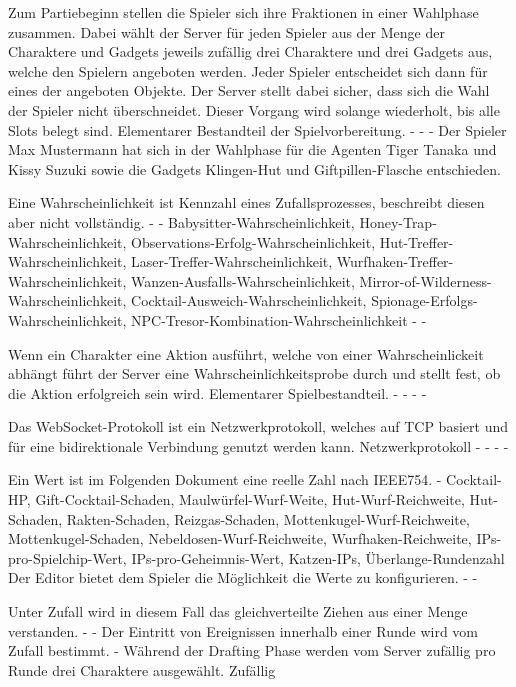 {Zum Partiebeginn stellen die Spieler sich ihre Fraktionen in einer Wahlphase zusammen. Dabei wählt der Server für jeden Spieler aus der Menge der Charaktere und Gadgets jeweils zufällig drei Charaktere und drei Gadgets aus, welche den Spielern angeboten werden. Jeder Spieler entscheidet sich dann für eines der angeboten Objekte. Der Server stellt dabei sicher, dass sich die Wahl der Spieler nicht überschneidet. Dieser Vorgang wird solange wiederholt, bis alle Slots belegt sind.}
{Elementarer Bestandteil der Spielvorbereitung.}
{-}
{-}
{-}
{Der Spieler \glqq{}Max Mustermann \grqq{} hat sich in der Wahlphase für die Agenten \glqq{}Tiger Tanaka\grqq{} und \glqq{}Kissy Suzuki\grqq{} sowie die Gadgets \glqq{}Klingen-Hut\grqq{} und \glqq{}Giftpillen-Flasche\grqq{} entschieden.}

{Eine Wahrscheinlichkeit ist Kennzahl eines Zufallsprozesses, beschreibt diesen aber nicht vollständig.}
{-}
{-}
{Babysitter-Wahrscheinlichkeit, Honey-Trap-Wahrscheinlichkeit, Observations-Erfolg-Wahrscheinlichkeit, Hut-Treffer-Wahrscheinlichkeit, Laser-Treffer-Wahrscheinlichkeit, Wurfhaken-Treffer-Wahrscheinlichkeit, Wanzen-Ausfalls-Wahrscheinlichkeit, Mirror-of-Wilderness-Wahrscheinlichkeit, Cocktail-Ausweich-Wahrscheinlichkeit, Spionage-Erfolgs-Wahrscheinlichkeit, NPC-Tresor-Kombination-Wahrscheinlichkeit}
{-}
{-}

{Wenn ein Charakter eine Aktion ausführt, welche von einer Wahrscheinlickeit abhängt führt der Server eine Wahrscheinlichkeitsprobe durch und stellt fest, ob die Aktion erfolgreich sein wird.}
{Elementarer Spielbestandteil.}
{-}
{-}
{-}
{-}

{Das WebSocket-Protokoll ist ein Netzwerkprotokoll, welches auf TCP basiert und für eine bidirektionale Verbindung genutzt werden kann.}
{Netzwerkprotokoll}
{-}
{-}
{-}
{-}

{Ein Wert ist im Folgenden Dokument eine reelle Zahl nach IEEE754.}
{-}
{Cocktail-HP, Gift-Cocktail-Schaden, Maulwürfel-Wurf-Weite, Hut-Wurf-Reichweite, Hut-Schaden, Rakten-Schaden, Reizgas-Schaden, Mottenkugel-Wurf-Reichweite, Mottenkugel-Schaden, Nebeldosen-Wurf-Reichweite, Wurfhaken-Reichweite, IPs-pro-Spielchip-Wert, IPs-pro-Geheimnis-Wert, Katzen-IPs, Überlange-Rundenzahl}
{Der Editor bietet dem Spieler die Möglichkeit die Werte zu konfigurieren.}
{-}
{-}

{Unter Zufall wird in diesem Fall das gleichverteilte Ziehen aus einer Menge verstanden.}
{-}
{-}
{Der Eintritt von Ereignissen innerhalb einer Runde wird vom Zufall bestimmt.}
{-}
{Während der Drafting Phase werden vom Server zufällig pro Runde drei Charaktere ausgewählt.}
{Zufällig}

